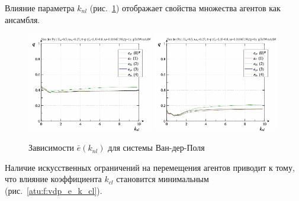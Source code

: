 Влияние параметра $k_{nl}$ (рис.~\ref{atu:f:vdp_e_k_nl})
отображает свойства множества агентов как ансамбля.

\begin{figure}[ht!]
\begin{center}
  \includegraphics[width=0.49\textwidth]{p/cha/vdp/vdp_id-p_k_nl_sign.png}
  \hfill
  \includegraphics[width=0.49\textwidth]{p/cha/vdp/vdp_id-p_k_nl_sin.png}
\end{center}
  \caption{Зависимости $\bar{e}(k_{nl})$ для системы Ван-дер-Поля}
\label{atu:f:vdp_e_k_nl}
\end{figure}

Наличие искусственных ограничений на перемещения агентов
приводит к тому, что влияние коэффициента $k_{cl}$
становится минимальным (рис.~\ref{atu:f:vdp_e_k_cl}).

